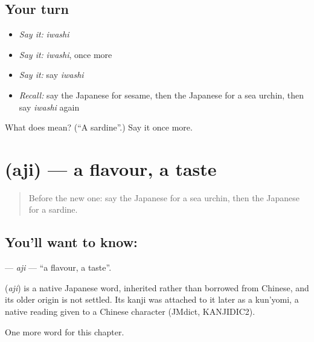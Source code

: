 \subsection*{Your turn}
\begin{itemize}
\raggedright
  \item \emph{Say it:} \emph{iwashi}
  \item \emph{Say it:} \emph{iwashi}, once more
  \item \emph{Say it:} say \emph{iwashi}
  \item \emph{Recall:} say the Japanese for sesame, then the Japanese for a sea urchin, then say \emph{iwashi} again
\end{itemize}

\begin{tcolorbox}[breakable,colback=teal!4,colframe=teal!35!black,title={Before you move on}]
What does  mean? (\textquotedblleft{}A sardine\textquotedblright{}.) Say it once more.
\end{tcolorbox}
\section[\texorpdfstring{\ja{あじ} (aji)}{あじ (aji)}]{ (aji) — a flavour, a taste}

\label{lesson:JA-C64-aji}



\begin{quote}
Before the new one: say the Japanese for a sea urchin, then the Japanese for a sardine.
\end{quote}

\subsection*{You'll want to know: }
\textbf{} — \emph{aji} — \textquotedblleft{}a flavour, a taste\textquotedblright{}.

\begin{cousinweb}
\textbf{} (\emph{aji}) is a native Japanese word, inherited rather than borrowed from Chinese, and its older origin is not settled. Its kanji was attached to it later as a kun'yomi, a native reading given to a Chinese character (JMdict, KANJIDIC2).
\end{cousinweb}

\begin{grammarlens}[title={What you've built}]
One more word for this chapter.
\end{grammarlens}

